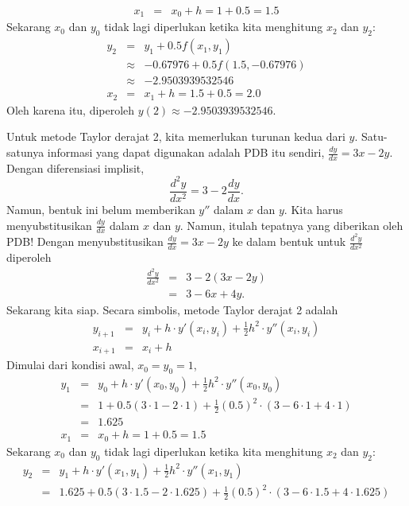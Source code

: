 \begin{description}
\begin{eqnarray*}
x_{1} & = & x_{0}+h=1+0.5=1.5
\end{eqnarray*}
Sekarang $x_{0}$ dan $y_{0}$ tidak lagi diperlukan ketika kita menghitung
$x_{2}$ dan $y_{2}$:
\begin{eqnarray*}
y_{2} & = & y_{1}+0.5f(x_{1},y_{1})\\
 & \approx & -0.67976+0.5f(1.5,-0.67976)\\
 & \approx & -2.9503939532546\\
x_{2} & = & x_{1}+h=1.5+0.5=2.0
\end{eqnarray*}
Oleh karena itu, diperoleh $y(2)\approx-2.9503939532546$.
\item [{\ref{exc:ode-taylor-9}a:}] Untuk metode Taylor derajat 2, kita
memerlukan turunan kedua dari $y$. Satu-satunya informasi yang dapat
digunakan adalah PDB itu sendiri, $\frac{dy}{dx}=3x-2y$. Dengan diferensiasi
implisit,
\[
\frac{d^{2}y}{dx^{2}}=3-2\frac{dy}{dx}.
\]
Namun, bentuk ini belum memberikan $y''$ dalam $x$ dan $y$. Kita
harus menyubstitusikan $\frac{dy}{dx}$ dalam $x$ dan $y$. Namun,
itulah tepatnya yang diberikan oleh PDB! Dengan menyubstitusikan $\frac{dy}{dx}=3x-2y$
ke dalam bentuk untuk $\frac{d^{2}y}{dx^{2}}$ diperoleh
\begin{eqnarray*}
\frac{d^{2}y}{dx^{2}} & = & 3-2(3x-2y)\\
 & = & 3-6x+4y.
\end{eqnarray*}
Sekarang kita siap. Secara simbolis, metode Taylor derajat 2 adalah
\begin{eqnarray*}
y_{i+1} & = & y_{i}+h\cdot y'(x_{i},y_{i})+\frac{1}{2}h^{2}\cdot y''(x_{i},y_{i})\\
x_{i+1} & = & x_{i}+h
\end{eqnarray*}
Dimulai dari kondisi awal, $x_{0}=y_{0}=1$,
\begin{eqnarray*}
y_{1} & = & y_{0}+h\cdot y'(x_{0},y_{0})+\frac{1}{2}h^{2}\cdot y''(x_{0},y_{0})\\
 & = & 1+0.5(3\cdot1-2\cdot1)+\frac{1}{2}(0.5)^{2}\cdot(3-6\cdot1+4\cdot1)\\
 & = & 1.625\\
x_{1} & = & x_{0}+h=1+0.5=1.5
\end{eqnarray*}
Sekarang $x_{0}$ dan $y_{0}$ tidak lagi diperlukan ketika kita menghitung
$x_{2}$ dan $y_{2}$:
\begin{eqnarray*}
y_{2} & = & y_{1}+h\cdot y'(x_{1},y_{1})+\frac{1}{2}h^{2}\cdot y''(x_{1},y_{1})\\
 & = & 1.625+0.5(3\cdot1.5-2\cdot1.625)+\frac{1}{2}(0.5)^{2}\cdot(3-6\cdot1.5+4\cdot1.625)\\

\end{eqnarray*}
\end{description}
